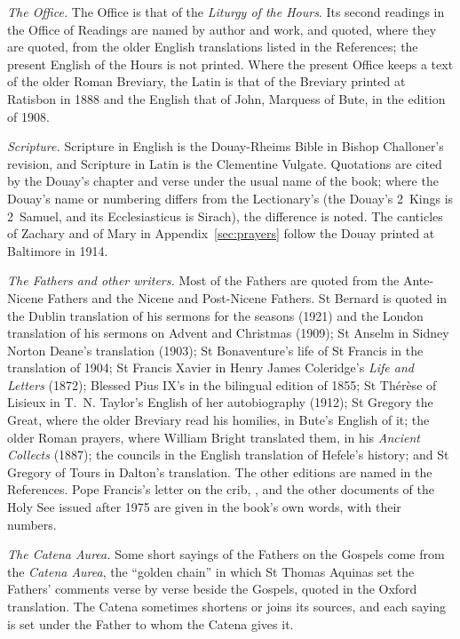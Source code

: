 \textit{The Office.} The Office is that of the \textit{Liturgy of the Hours}.
Its second readings in the Office of Readings are named by author and work, and
quoted, where they are quoted, from the older English translations listed in
the References; the present English of the Hours is not printed. Where the
present Office keeps a text of the older Roman Breviary, the Latin is that of
the Breviary printed at Ratisbon in 1888 and the English that of John, Marquess
of Bute, in the edition of 1908.

\textit{Scripture.} Scripture in English is the Douay-Rheims Bible in Bishop
Challoner's revision, and Scripture in Latin is the Clementine Vulgate.
Quotations are cited by the Douay's chapter and verse under the usual name of
the book; where the Douay's name or numbering differs from the Lectionary's
(the Douay's 2~Kings is 2~Samuel, and its Ecclesiasticus is Sirach), the
difference is noted. The canticles of Zachary and of Mary in
Appendix~\ref{sec:prayers} follow the Douay printed at Baltimore in 1914.

\textit{The Fathers and other writers.} Most of the Fathers are quoted from the
Ante-Nicene Fathers and the Nicene and Post-Nicene Fathers. St Bernard is quoted
in the Dublin translation of his sermons for the seasons (1921) and the London
translation of his sermons on Advent and Christmas (1909); St Anselm in Sidney
Norton Deane's translation (1903); St Bonaventure's life of St Francis in the
translation of 1904; St Francis Xavier in Henry James Coleridge's \textit{Life
and Letters} (1872); Blessed Pius IX's  in the bilingual
edition of 1855; St Thérèse of Lisieux in T.~N. Taylor's English of her
autobiography (1912); St Gregory the Great, where the older Breviary read his
homilies, in Bute's English of it; the older Roman prayers, where William Bright
translated them, in his \textit{Ancient Collects} (1887); the councils in the
English translation of Hefele's history; and St Gregory of Tours in Dalton's
translation. The other editions are named in the References. Pope Francis's
letter on the crib, , and the other documents of the
Holy See issued after 1975 are given in the book's own words, with their numbers.

\textit{The Catena Aurea.} Some short sayings of the Fathers on the Gospels
come from the \textit{Catena Aurea}, the ``golden chain'' in which St Thomas
Aquinas set the Fathers' comments verse by verse beside the Gospels, quoted in
the Oxford translation. The Catena sometimes shortens or joins its sources, and
each saying is set under the Father to whom the Catena gives it.

